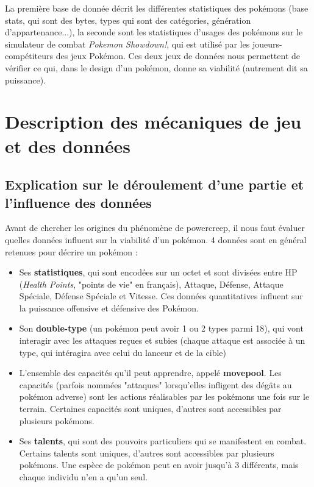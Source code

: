 \documentclass[a4paper,12pt]{article}
\begin{document}
La première base de donnée décrit les différentes statistiques des pokémons
(base stats, qui sont des bytes, types qui sont des catégories, génération
d'appartenance...), la seconde sont les statistiques d'usages des pokémons sur
le simulateur de combat \textit{Pokemon Showdown!}, qui est utilisé par les
joueurs-compétiteurs des jeux Pokémon. Ces deux jeux de données nous permettent
de vérifier ce qui, dans le design d'un pokémon, donne sa viabilité (autrement
dit sa puissance). 

\newpage
\section{Description des mécaniques de jeu et des données}
\subsection{Explication sur le déroulement d'une partie et l'influence des données}

Avant de chercher les origines du phénomène de powercreep, il nous faut évaluer
quelles données influent sur la viabilité d'un pokémon. 4 données sont en
général retenues pour décrire un pokémon :

\begin{itemize}
    \item Ses \textbf{statistiques}, qui sont encodées sur un octet et sont
    divisées entre HP (\textit{Health Points}, "points de vie" en français),
    Attaque, Défense, Attaque Spéciale, Défense Spéciale et Vitesse. Ces données
    quantitatives influent sur la puissance offensive et défensive des Pokémon.
    \item Son \textbf{double-type} (un pokémon peut avoir 1 ou 2 types parmi
    18), qui vont interagir avec les attaques reçues et subies (chaque attaque
    est associée à un type, qui intéragira avec celui du lanceur et de la cible)
    \item L'ensemble des capacités qu'il peut apprendre, appelé
    \textbf{movepool}. Les capacités (parfois nommées "attaques" lorsqu'elles
    infligent des dégâts au pokémon adverse) sont les actions réalisables par
    les pokémons une fois sur le terrain. Certaines capacités sont uniques,
    d'autres sont accessibles par plusieurs pokémons.
    \item Ses \textbf{talents}, qui sont des pouvoirs particuliers qui se
    manifestent en combat. Certains talents sont uniques, d'autres sont
    accessibles par plusieurs pokémons. Une espèce de pokémon peut en avoir
    jusqu'à 3 différents, mais chaque individu n'en a qu'un seul.
\end{itemize}
\end{document}

